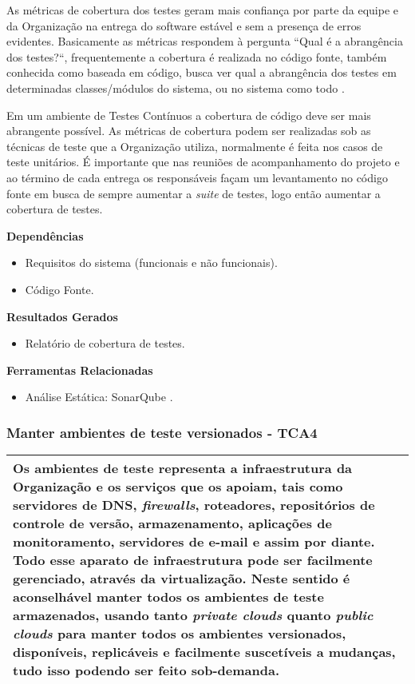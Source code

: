 As métricas de cobertura dos testes geram mais confiança por parte da equipe e da Organização na entrega do software estável e sem a presença de erros evidentes. Basicamente as métricas respondem à pergunta “Qual é a abrangência dos testes?“, frequentemente a cobertura é realizada no código fonte, também conhecida como baseada em código, busca ver qual a abrangência dos testes em determinadas classes/módulos do sistema, ou no sistema como todo \cite{RUP940320}.

Em um ambiente de Testes Contínuos a cobertura de código deve ser mais abrangente possível. As métricas de cobertura podem ser realizadas sob as técnicas de teste que a Organização utiliza, normalmente é feita nos casos de teste unitários. É importante que nas reuniões de acompanhamento do projeto e ao término de cada entrega os responsáveis façam um levantamento no código fonte em busca de sempre aumentar a \textit{suite} de testes, logo então aumentar a cobertura de testes.


\textbf{Dependências}
\begin{itemize}
    \item Requisitos do sistema (funcionais e não funcionais).
    \item Código Fonte.
\end{itemize}

\textbf{Resultados Gerados}
\begin{itemize}
    \item Relatório de cobertura de testes.

\end{itemize}

\textbf{Ferramentas Relacionadas}
\begin{itemize}
    \item Análise Estática: SonarQube \cite{SonarQube}.
\end{itemize}


\subsubsection{Manter ambientes de teste versionados - TCA4}
\label{sec:tca3}

\begin{table}[H]
\centering
\begin{tabular}{|p{130mm}|}
\hline
Os ambientes de teste representa a infraestrutura da Organização e os serviços que os apoiam, tais como servidores de DNS, \textit{firewalls}, roteadores, repositórios de controle de versão, armazenamento, aplicações de monitoramento, servidores de e-mail e assim por diante. Todo esse aparato de infraestrutura pode ser facilmente gerenciado, através da virtualização. Neste sentido é aconselhável manter todos os ambientes de teste armazenados, usando tanto \textit{private clouds} quanto \textit{public clouds} para manter todos os ambientes versionados, disponíveis, replicáveis e facilmente suscetíveis a mudanças, tudo isso podendo ser feito sob-demanda. \\ 
\hline
\end{tabular}
\end{table}

